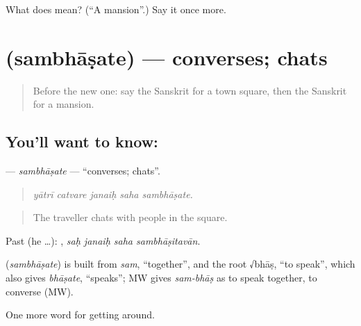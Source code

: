 \begin{tcolorbox}[breakable,colback=teal!4,colframe=teal!35!black,title={Before you move on}]
What does  mean? (\textquotedblleft{}A mansion\textquotedblright{}.) Say it once more.
\end{tcolorbox}
\section[\texorpdfstring{\sk{सम्भाषते} (sambhāṣate)}{सम्भाषते (sambhāṣate)}]{ (sambhāṣate) — converses; chats}

\label{lesson:SA-C421-sambhasate}



\begin{quote}
Before the new one: say the Sanskrit for a town square, then the Sanskrit for a mansion.
\end{quote}

\subsection*{You'll want to know: }
\textbf{} — \emph{sambhāṣate} — \textquotedblleft{}converses; chats\textquotedblright{}.

\begin{quote}
    
\end{quote}

\begin{quote}
\emph{yātrī catvare janaiḥ saha sambhāṣate.}
\end{quote}

\begin{quote}
The traveller chats with people in the square.
\end{quote}

Past (he …):    , \emph{saḥ janaiḥ saha sambhāṣitavān}.

\begin{cousinweb}
\textbf{} (\emph{sambhāṣate}) is built from \emph{sam}, \textquotedblleft{}together\textquotedblright{}, and the root √bhāṣ, \textquotedblleft{}to speak\textquotedblright{}, which also gives \emph{bhāṣate}, \textquotedblleft{}speaks\textquotedblright{}; MW gives \emph{sam-bhāṣ} as to speak together, to converse (MW).
\end{cousinweb}

\begin{grammarlens}[title={What you've built}]
One more word for getting around.
\end{grammarlens}

